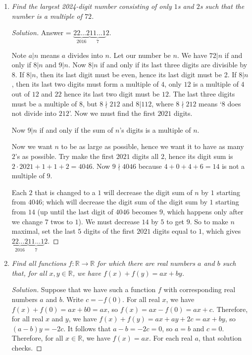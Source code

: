 \documentclass[12pt]{article}
\begin{document}
\begin{enumerate}[itemsep=2\bigskipamount,topsep=3\bigskipamount]
\item \textit{Find the largest 2024-digit number consisting of only $1$s and $2$s such that the number is a multiple of $72$.}

\begin{proof}[Solution]
Answer = $\underbrace{22\dots 2}_{2016}\underbrace{11\dots 1}_{7}2$.

Note $a|n$ means $a$ divides into $n$.
Let our number be $n$.
We have $72|n$ if and only if $8|n$ and $9|n$.
Now $8|n$ if and only if its last three digits are divisible by $8$.
If $8|n$, then its last digit must be even, hence its last digit must be 2.
If $8|n$, then its last two digits must form a multiple of $4$, only $12$ is a multiple of $4$ out of $12$ and $22$ hence its last two digit must be $12$.
The last three digits must be a multiple of $8$, but $8\nmid 212$ and $8|112$, where $8\nmid 212$ means `$8$ does not divide into $212$'.
Now we must find the first $2021$ digits.

Now $9|n$ if and only if the sum of $n$'s digits is a multiple of $n$.

Now we want $n$ to be as large as possible, hence we want it to have as many $2$'s as possible.
Try make the first $2021$ digits all $2$, hence its digit sum is $2\cdot 2021+1+1+2=4046$.
Now $9\nmid 4046$ because $4+0+4+6=14$ is not a multiple of $9$.

Each $2$ that is changed to a $1$ will decrease the digit sum of $n$ by $1$ starting from $4046$; which will decrease the digit sum of the digit sum by $1$ starting from $14$ (up until the last digit of $4046$ becomes $9$, which happens only after we change $7$ twos to $1$).
We must decrease $14$ by $5$ to get $9$.
So to make $n$ maximal, set the last $5$ digits of the first $2021$ digits equal to $1$, which gives $\underbrace{22\dots 2}_{2016}\underbrace{11\dots 1}_{7}2$.    
\end{proof}

\item \textit{Find all functions \(f: \mathbb{R} \rightarrow \mathbb{R}\) for which there are real numbers \(a\) and \(b\) such that, for all \(x, y \in \mathbb{R}\), we have \(f(x) + f(y) = ax + by\).}

\begin{proof}[Solution]
Suppose that we have such a function \(f\) with corresponding real numbers \(a\) and \(b\). Write \(c = -f(0)\). For all real \(x\), we have \(f(x) + f(0) = ax + b0 = ax\), so \(f(x) = ax - f(0) = ax + c\). Therefore, for all real \(x\) and \(y\), we have \(f(x) + f(y) = ax + ay + 2c = ax + by\), so \((a - b)y = -2c\). It follows that \(a - b = -2c = 0\), so \(a = b\) and \(c = 0\). Therefore, for all \(x \in \mathbb{R}\), we have \(f(x) = ax\). For each real \(a\), that solution checks.
\end{proof}


\end{enumerate}
\end{document}
